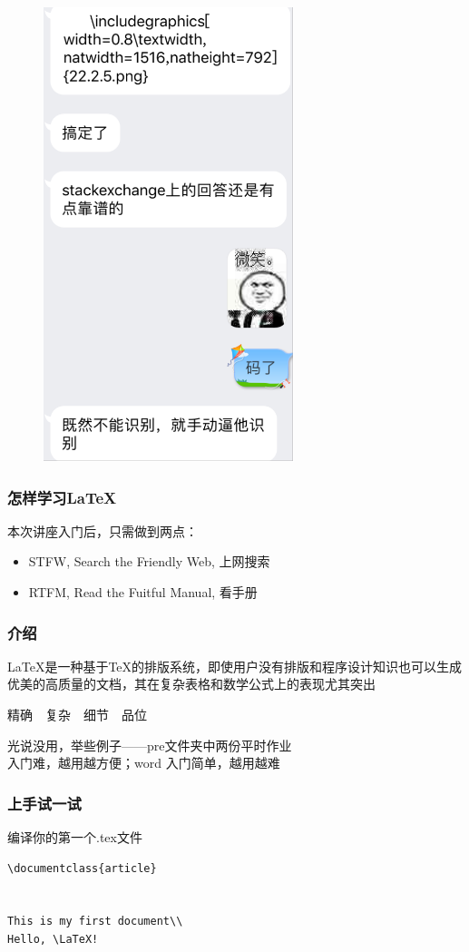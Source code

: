 \begin{frame}
\begin{figure}
\begin{minipage}[t]{0.48\textwidth}
    \includegraphics[width=0.65\textwidth]{img//xieyi2.png}
    \end{minipage}
    \end{figure}
\end{frame}

\begin{frame}
    \frametitle{怎样学习\LaTeX}
    本次讲座入门后，只需做到两点：
    \begin{itemize}
        \item STFW, Search the Friendly Web, 上网搜索
        \item RTFM, Read the Fuitful Manual, 看手册
    \end{itemize}
\end{frame}

\begin{frame}
    \frametitle{介绍}
    \LaTeX 是一种基于\TeX 的排版系统，即使用户没有排版和程序设计知识也可以生成优美的高质量的文档，其在复杂表格和数学公式上的表现尤其突出\\\pause
    \begin{center}
    精确\ \ 复杂\ \ 细节\ \ 品位
    \end{center}
    光说没用，举些例子——pre文件夹中两份平时作业\\\pause
     入门难，越用越方便；word 入门简单，越用越难
\end{frame}

\begin{frame}[fragile]
    \frametitle{上手试一试}
编译你的第一个.tex文件

\begin{lstlisting}
\documentclass{article}
   

This is my first document\\
Hello, \LaTeX!

\end{lstlisting}

\end{frame}